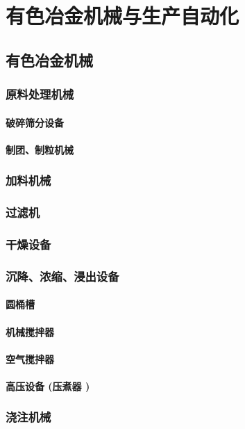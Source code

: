 \documentclass[UTF8]{../../ApplicationUniverse}
\begin{document}
\section{有色冶金机械与生产自动化}
    \subsection{有色冶金机械}
        \subsubsection{原料处理机械}
            \paragraph{破碎筛分设备}
            \paragraph{制团、制粒机械}
        \subsubsection{加料机械}
        \subsubsection{过滤机}
        \subsubsection{干燥设备}
        \subsubsection{沉降、浓缩、浸出设备}
            \paragraph{圆桶槽}
            \paragraph{机械搅拌器}
            \paragraph{空气搅拌器}
            \paragraph{高压设备 (压煮器 )}
        \subsubsection{浇注机械}
\end{document}
